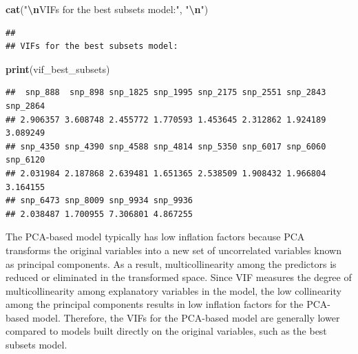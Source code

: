 \documentclass[
]{article}
\newenvironment{Shaded}{\begin{snugshade}}{\end{snugshade}}
\newcommand{\FunctionTok}[1]{\textcolor[rgb]{0.13,0.29,0.53}{\textbf{#1}}}
\newcommand{\NormalTok}[1]{#1}
\newcommand{\SpecialCharTok}[1]{\textcolor[rgb]{0.81,0.36,0.00}{\textbf{#1}}}
\newcommand{\StringTok}[1]{\textcolor[rgb]{0.31,0.60,0.02}{#1}}
\begin{document}
\begin{Shaded}
\begin{Highlighting}[]
\FunctionTok{cat}\NormalTok{(}\StringTok{"}\SpecialCharTok{\textbackslash{}n}\StringTok{VIFs for the best subsets model:"}\NormalTok{, }\StringTok{"}\SpecialCharTok{\textbackslash{}n}\StringTok{"}\NormalTok{)}
\end{Highlighting}
\end{Shaded}

\begin{verbatim}
## 
## VIFs for the best subsets model:
\end{verbatim}

\begin{Shaded}
\begin{Highlighting}[]
\FunctionTok{print}\NormalTok{(vif\_best\_subsets)}
\end{Highlighting}
\end{Shaded}

\begin{verbatim}
##  snp_888  snp_898 snp_1825 snp_1995 snp_2175 snp_2551 snp_2843 snp_2864 
## 2.906357 3.608748 2.455772 1.770593 1.453645 2.312862 1.924189 3.089249 
## snp_4350 snp_4390 snp_4588 snp_4814 snp_5350 snp_6017 snp_6060 snp_6120 
## 2.031984 2.187868 2.639481 1.651365 2.538509 1.908432 1.966804 3.164155 
## snp_6473 snp_8009 snp_9934 snp_9936 
## 2.038487 1.700955 7.306801 4.867255
\end{verbatim}

The PCA-based model typically has low inflation factors because PCA
transforms the original variables into a new set of uncorrelated
variables known as principal components. As a result, multicollinearity
among the predictors is reduced or eliminated in the transformed space.
Since VIF measures the degree of multicollinearity among explanatory
variables in the model, the low collinearity among the principal
components results in low inflation factors for the PCA-based model.
Therefore, the VIFs for the PCA-based model are generally lower compared
to models built directly on the original variables, such as the best
subsets model.
\end{document}
